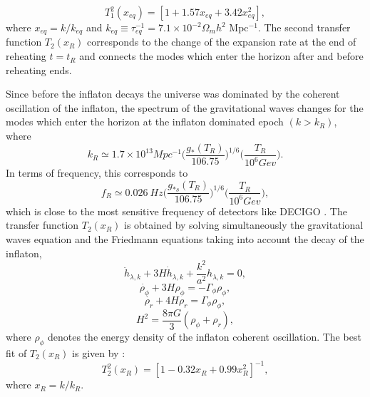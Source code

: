 \documentclass[11pt,a4paper,twoside]{book}
\begin{document}
\begin{equation}
	\label{TransferFunction}
	T_{1}^{2}(x_{eq})=[1+1.57 x_{eq} + 3.42 x_{eq}^{2} ],
\end{equation}
where $ x_{eq} = k/k_{eq} $ and $ k_{eq} \equiv \tau_{eq}^{-1} = 7.1 \times 10^{-2} \Omega_{m} h^{2} $ Mpc$^{-1}$. The second transfer function $ T_{2}(x_{R}) $ corresponds to the change of the expansion rate at the end of reheating $ t=t_{R} $ and connects the modes which enter the horizon after and before  reheating ends. 

Since before the inflaton decays the universe was dominated by the coherent oscillation of the inflaton, the spectrum of the gravitational waves changes for the modes which enter the horizon at the inflaton dominated epoch $ (k>k_{R}) $, where
\begin{equation}
	\label{Chap3:kReheating}
	k_{R}\simeq 1.7 \times 10^{13} Mpc^{-1} \Bigg(\frac{g_{*}(T_{R})}{106.75}\Bigg)^{1/6}\Bigg(\frac{T_{R}}{10^{6}Gev}\Bigg).
\end{equation}
In terms of frequency, this corresponds to 
\begin{equation}
	\label{Chap3:frequencyReheating}
	f_{R} \simeq 0.026\ Hz \Bigg (\frac{g_{*s}(T_{R})}{106.75}\Bigg)^{1/6}\Bigg ( \frac{T_{R}}{10^{6} Gev} \Bigg),
\end{equation}
which is close to the most sensitive frequency of detectors like DECIGO \cite{Chap3:ProibingReheatingTemperature2008}. The transfer function $ T_{2}(x_{R}) $ is obtained  by solving simultaneously the gravitational waves equation and the Friedmann equations taking into account the decay of the inflaton,
\begin{equation}
\ddot{h}_{\lambda,k} + 3H\dot{h}_{\lambda,k} + \frac{k^{2}}{a^{2}}h_{\lambda,k} = 0,
\end{equation}
\begin{equation}
	\dot{\rho_{\phi}} + 3H\rho_{\phi} = -\Gamma_{\phi}\rho_{\phi},
\end{equation}
\begin{equation}
	\dot{\rho_{r}} + 4H\rho_{r} = \Gamma_{\phi}\rho_{\phi},	
\end{equation}
\begin{equation}
	H^{2}=\dfrac{8\pi G}{3}(\rho_{\phi} + \rho_{r}),
\end{equation}
where $\rho_{\phi}$ denotes the energy density of the inflaton coherent oscillation. The best fit of $ T_{2}(x_{R}) $ is given by \cite{Chap3:ProibingReheatingTemperature2008}:
\begin{equation}
	\label{Chap3:TransferFunction2}
	 T_{2}^{2}(x_{R}) = [1-0.32 x_{R} + 0.99 x^{2}_{R}]^{-1},
\end{equation}
where $ x_{R} = k/k_{R} $.
\end{document}
